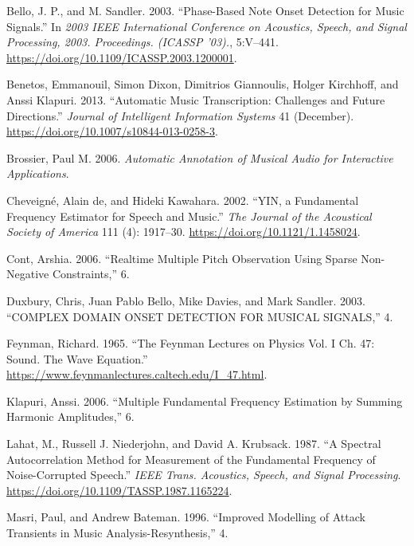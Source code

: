 \documentclass[
  american,
]{article}
\newlength{\cslhangindent}
\newenvironment{cslreferences}%
  {\setlength{\parindent}{0pt}%
  \everypar{\setlength{\hangindent}{\cslhangindent}}\ignorespaces}%
  {\par}
\begin{document}
\hypertarget{refs}{}
\begin{cslreferences}
\leavevmode\hypertarget{ref-bello}{}%
Bello, J. P., and M. Sandler. 2003. ``Phase-Based Note Onset Detection for Music Signals.'' In \emph{2003 IEEE International Conference on Acoustics, Speech, and Signal Processing, 2003. Proceedings. (ICASSP '03).}, 5:V--441. \url{https://doi.org/10.1109/ICASSP.2003.1200001}.

\leavevmode\hypertarget{ref-benetos_2013}{}%
Benetos, Emmanouil, Simon Dixon, Dimitrios Giannoulis, Holger Kirchhoff, and Anssi Klapuri. 2013. ``Automatic Music Transcription: Challenges and Future Directions.'' \emph{Journal of Intelligent Information Systems} 41 (December). \url{https://doi.org/10.1007/s10844-013-0258-3}.

\leavevmode\hypertarget{ref-brossier}{}%
Brossier, Paul M. 2006. \emph{Automatic Annotation of Musical Audio for Interactive Applications}.

\leavevmode\hypertarget{ref-yin_2002}{}%
Cheveigné, Alain de, and Hideki Kawahara. 2002. ``YIN, a Fundamental Frequency Estimator for Speech and Music.'' \emph{The Journal of the Acoustical Society of America} 111 (4): 1917--30. \url{https://doi.org/10.1121/1.1458024}.

\leavevmode\hypertarget{ref-cont_2006}{}%
Cont, Arshia. 2006. ``Realtime Multiple Pitch Observation Using Sparse Non-Negative Constraints,'' 6.

\leavevmode\hypertarget{ref-duxbury}{}%
Duxbury, Chris, Juan Pablo Bello, Mike Davies, and Mark Sandler. 2003. ``COMPLEX DOMAIN ONSET DETECTION FOR MUSICAL SIGNALS,'' 4.

\leavevmode\hypertarget{ref-feynman}{}%
Feynman, Richard. 1965. ``The Feynman Lectures on Physics Vol. I Ch. 47: Sound. The Wave Equation.'' \url{https://www.feynmanlectures.caltech.edu/I_47.html}.

\leavevmode\hypertarget{ref-klapuri}{}%
Klapuri, Anssi. 2006. ``Multiple Fundamental Frequency Estimation by Summing Harmonic Amplitudes,'' 6.

\leavevmode\hypertarget{ref-lahat_spectral_1987}{}%
Lahat, M., Russell J. Niederjohn, and David A. Krubsack. 1987. ``A Spectral Autocorrelation Method for Measurement of the Fundamental Frequency of Noise-Corrupted Speech.'' \emph{IEEE Trans. Acoustics, Speech, and Signal Processing}. \url{https://doi.org/10.1109/TASSP.1987.1165224}.

\leavevmode\hypertarget{ref-hfc}{}%
Masri, Paul, and Andrew Bateman. 1996. ``Improved Modelling of Attack Transients in Music Analysis-Resynthesis,'' 4.


\end{cslreferences}
\end{document}
